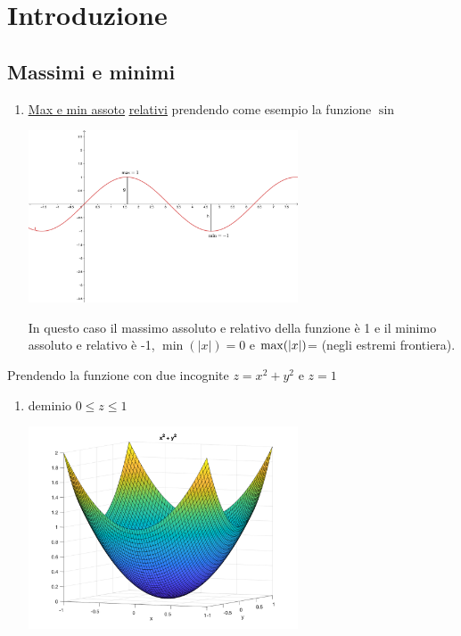 \chapter{Introduzione}
\section{Massimi e minimi}
\begin{enumerate}
\item \underline{\underline{Max e min assoto}} \textrightarrow \underline{\underline{relativi}} prendendo come esempio la funzione $\sin$
  \begin{center}
    \includegraphics[width=8cm]{img/sin_ex.png}
  \end{center}
  In questo caso il massimo assoluto e relativo della funzione è 1 e il minimo assoluto e relativo è -1, $\min(|x|)=0$ e $\max (\lvert x\rvert)$= (negli estremi frontiera). 
\end{enumerate}
\begin{esempio}
  Prendendo la funzione con due incognite $z=x^2+y^2$ e $z=1$
  \begin{enumerate}
  \item deminio $0\leq z\leq 1$
  \begin{center}
    \includegraphics[width=8cm]{img/par.png}
  \end{center}
 
  \end{enumerate}
\end{esempio}
    
